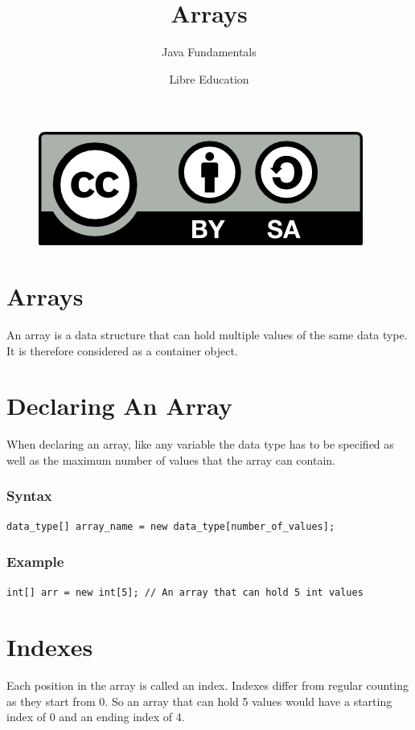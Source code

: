 \documentclass[a4paper]{article}
\title{Arrays}
\subtitle{Java Fundamentals}
\date{}
\author{Libre Education}
\begin{document}
\maketitle


\begin{figure}[b]
\includegraphics{BY-SA}
\centering
\end{figure}

\newpage

\section*{Arrays}

An array is a data structure that can hold multiple values of the same data
type. It is therefore considered as a container object.

\section*{Declaring An Array}
When declaring an array, like any variable the data type has to be specified
as well as the maximum number of values that the array can contain.

\subsubsection*{Syntax}
\begin{lstlisting}
data_type[] array_name = new data_type[number_of_values];
\end{lstlisting}

\subsubsection*{Example}
\begin{lstlisting}
int[] arr = new int[5]; // An array that can hold 5 int values
\end{lstlisting}

\section*{Indexes}
Each position in the array is called an index. Indexes differ from regular
counting as they start from 0. So an array that can hold 5 values would have a
starting index of 0 and an ending index of 4.
\end{document}
